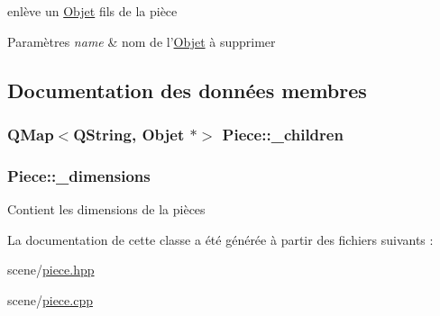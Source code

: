 enlève un \hyperlink{class_objet}{Objet} fils de la pièce 


\begin{DoxyParams}{Paramètres}
{\em name} & nom de l'\hyperlink{class_objet}{Objet} à supprimer \\
\hline
\end{DoxyParams}


\subsection{Documentation des données membres}
\hypertarget{class_piece_ac80078a597e7edcd297895bab25731e6}{
\subsubsection[{\+\_\+children}]{\setlength{\rightskip}{0pt plus 5cm}Q\+Map$<$Q\+String, {\bf Objet} $\ast$$>$ Piece\+::\+\_\+children\hspace{0.3cm}{\ttfamily [private]}}}\label{class_piece_ac80078a597e7edcd297895bab25731e6}
\hypertarget{class_piece_a47a3458694b894041bd95a1666c9bf3d}{
\subsubsection[{\+\_\+dimensions}]{ Piece\+::\+\_\+dimensions\hspace{0.3cm}{\ttfamily [private]}}}\label{class_piece_a47a3458694b894041bd95a1666c9bf3d}
Contient les dimensions de la pièces 

La documentation de cette classe a été générée à partir des fichiers suivants \+:\begin{DoxyCompactItemize}
\item 
scene/\hyperlink{piece_8hpp}{piece.\+hpp}\item 
scene/\hyperlink{piece_8cpp}{piece.\+cpp}\end{DoxyCompactItemize}
